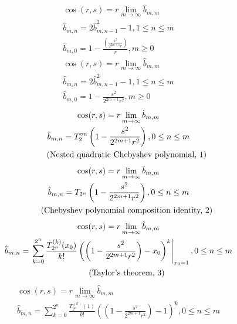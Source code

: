 \documentclass[a4paper,12pt]{report}
\newcommand{\equationnote}[1]{%
    \refstepcounter{equation}%
    \tag{#1, \theequation}%
}
\begin{document}
\begin{subequations}
\begin{gather}
\cos(r,s) = r \lim \limits_{m \to \infty} \hat{b}_{m,m} \\
\hat{b}_{m,n} = 2 \hat{b}_{m,n-1}^2 - 1, 1 \leq n \leq m \\
\hat{b}_{m,0} = 1 - \frac{\left(\frac{s^2}{2^{2m+1}r}\right)}{r}, m \geq 0
\end{gather}
\end{subequations}
\begin{subequations}
\begin{gather}
\cos(r,s) = r \lim \limits_{m \to \infty} \hat{b}_{m,m} \\
\hat{b}_{m,n} = 2 \hat{b}_{m,n-1}^2 - 1, 1 \leq n \leq m \\
\hat{b}_{m,0} = 1 - \frac{s^2}{2^{2m+1}r^2}, m \geq 0
\end{gather}
\end{subequations}
\begin{subequations}
\begin{gather}
\cos(r,s) = r \lim \limits_{m \to \infty} \hat{b}_{m,m} \\
\hat{b}_{m,n} = T_2^{\circ n}\left(1 - \frac{s^2}{2^{2m+1}r^2}\right), 0 \leq n \leq m \notag \\
\equationnote{Nested quadratic Chebyshev polynomial}
\end{gather}
\end{subequations}
\begin{subequations}
\begin{gather}
\cos(r,s) = r \lim \limits_{m \to \infty} \hat{b}_{m,m} \\
\hat{b}_{m,n} = T_{2^n}\left(1 - \frac{s^2}{2^{2m+1}r^2}\right), 0 \leq n \leq m \notag \\
\equationnote{Chebyshev polynomial composition identity}
\end{gather}
\end{subequations}
\begin{subequations}
\begin{gather}
\cos(r,s) = r \lim \limits_{m \to \infty} \hat{b}_{m,m} \\
\hat{b}_{m,n} = \left. \sum \limits_{k=0}^{2^n} \frac{T_{2^n}^{(k)}(x_0)}{k!} \left(\left(1 - \frac{s^2}{2^{2m+1}r^2}\right) - x_0\right)^k\right|_{x_0 = 1}, 0 \leq n \leq m \notag \\
\equationnote{Taylor's theorem}
\end{gather}
\end{subequations}
\begin{subequations}
\begin{gather}
\cos(r,s) = r \lim \limits_{m \to \infty} \hat{b}_{m,m} \\
\hat{b}_{m,n} = \sum \limits_{k=0}^{2^n} \frac{T_{2^n}^{(k)}(1)}{k!} \left(\left(1 - \frac{s^2}{2^{2m+1}r^2}\right) - 1\right)^k, 0 \leq n \leq m
\end{gather}
\end{subequations}
\end{document}
